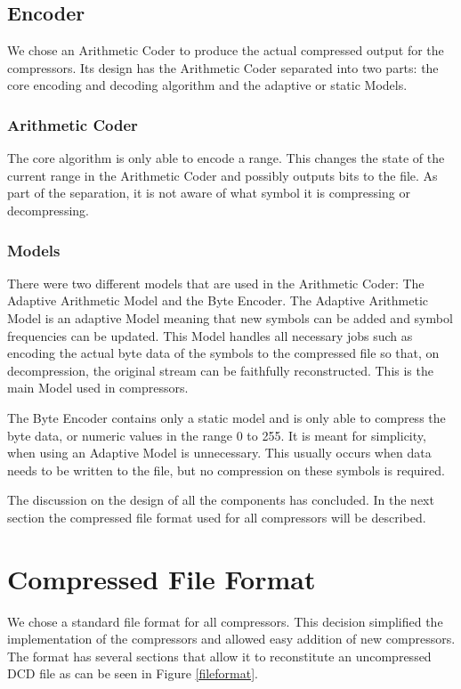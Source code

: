 \documentclass[a4paper,11pt]{report}
\begin{document}
\subsection{Encoder}

We chose an Arithmetic Coder to produce the actual compressed output for the compressors. Its design has the Arithmetic Coder separated into two parts: the core encoding and decoding algorithm and the adaptive or static Models. 

\subsubsection{Arithmetic Coder}

The core algorithm is only able to encode a range. This changes the state of the current range in the Arithmetic Coder and possibly outputs bits to the file. As part of the separation, it is not aware of what symbol it is compressing or decompressing.

\subsubsection{Models}

There were two different models that are used in the Arithmetic Coder: The Adaptive Arithmetic Model and the Byte Encoder. The Adaptive Arithmetic Model is an adaptive Model meaning that new symbols can be added and symbol frequencies can be updated. This Model handles all necessary jobs such as encoding the actual byte data of the symbols to the compressed file so that, on decompression, the original stream can be faithfully reconstructed. This is the main Model used in compressors.

The Byte Encoder contains only a static model and is only able to compress the byte data, or numeric values in the range 0 to 255. It is meant for simplicity, when using an Adaptive Model is unnecessary. This usually occurs when data needs to be written to the file, but no compression on these symbols is required. 

The discussion on the design of all the components has concluded. In the next section the compressed file format used for all compressors will be described.


\section{Compressed File Format}

We chose a standard file format for all compressors. This decision simplified the implementation of the compressors and allowed easy addition of new compressors. The format has several sections that allow it to reconstitute an uncompressed DCD file as can be seen in Figure \ref{fileformat}.
\end{document}
